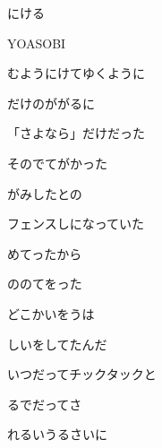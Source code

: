 \documentclass[a4paper,tate,twocolumn,12pt]{ltjtarticle}
\begin{document}
\thispagestyle{empty}

\begin{center}
{\LARGE {}にける}

{\large YOASOBI}
\end{center}

\vspace{1em}

\begin{flushleft}

\noindent\begin{minipage}{\linewidth}
むようにけてゆくように

だけのががるに
\end{minipage}

\vspace{2em}

\noindent\begin{minipage}{\linewidth}
「さよなら」だけだった

そのでてがかった

がみしたとの

フェンスしになっていた
\end{minipage}

\vspace{2em}

\noindent\begin{minipage}{\linewidth}
めてったから

ののてをった

どこかいをうは

しいをしてたんだ
\end{minipage}

\vspace{2em}

\noindent\begin{minipage}{\linewidth}
いつだってチックタックと

るでだってさ

れるいうるさいに


\end{minipage}
\end{flushleft}
\end{document}
